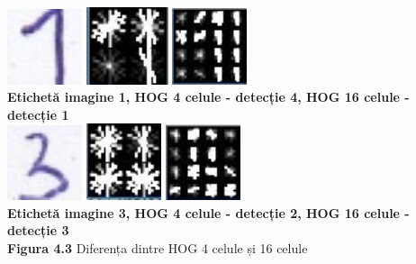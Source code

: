\documentclass[a4paper,12pt]{report}
\begin{document}
\begin {center} 
	\begin {footnotesize} 
		\includegraphics[width = 22mm]{fig4_3_1} 
		\includegraphics[width = 24mm]{fig4_3_2} 
		\includegraphics[width = 22mm]{fig4_3_3} \\
		\textbf {Etichetă imagine 1, HOG 4 celule - detecție 4, HOG 16 celule - detecție 1} \\
		\includegraphics[width = 22mm]{fig4_3_4} 
		\includegraphics[width = 22mm]{fig4_3_5} 
		\includegraphics[width = 22mm]{fig4_3_6}  \\
		\textbf {Etichetă imagine 3, HOG 4 celule - detecție 2, HOG 16 celule - detecție 3} \\
		\textbf  {Figura 4.3} Diferența dintre HOG 4 celule și 16 celule
	\end {footnotesize} 
\end {center}


\chapter*{}
\end{document}
